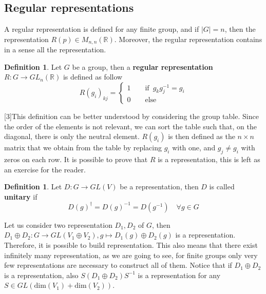 \documentclass[12pt]{book}
\theoremstyle{plain}
\newcommand{\R}{\mathbb{R}}
\theoremstyle{definition}
\newtheorem{dfn}[thm]{Definition}
\theoremstyle{remark}
\begin{document}
\subsection{Regular representations}
A regular representation is defined for any finite group, and if $|G|=n$, then the representation $R(p)\in M_{n,n}(\R)$. Moreover, the regular representation contains in a sense all the representation.
\begin{dfn}
Let $G$ be a group, then a \textbf{regular representation} $R:G\to GL_n(\R)$ is defined as follow
\[R(g_i)_{kj} = \begin{cases}
1\qquad \text{if}\,\,\, g_kg_j^{-1} = g_i\\
0 \qquad \text{else}
\end{cases}\]
\end{dfn}
[3]This definition can be better understood by considering the group table. Since the order of the elements is not relevant, we can sort the table such that, on the diagonal, there is only the neutral element. $R(g_i)$ is then defined as the $n\times n$ matrix that we obtain from the table by replacing $g_i$ with one, and $g_j\neq g_i$ with zeros on each row.
It is possible to prove that $R$ is a representation, this is left as an exercise for the reader.
\begin{dfn}
Let $D:G\to GL(V)$ be a representation, then $D$ is called \textbf{unitary} if
\[D(g)^\dagger = D(g)^{-1} = D(g^{-1})\quad \forall g \in G\]
\end{dfn}
Let us consider two representation $D_1,D_2$ of $G$, then $D_1\oplus D_2:G \to GL(V_1\oplus V_2),g\mapsto D_1(g)\oplus D_2(g)$ is a representation. Therefore, it is possible to build representation. This also means that there exist infinitely many representation, as we are going to see, for finite groups only very few representations are necessary to construct all of them. Notice that if $D_1\oplus D_2$ is a representation, also $S(D_1\oplus D_2)S^{-1}$ is a representation for any $S\in GL(\text{dim}(V_1)+\text{dim}(V_2))$. 
\end{document}

